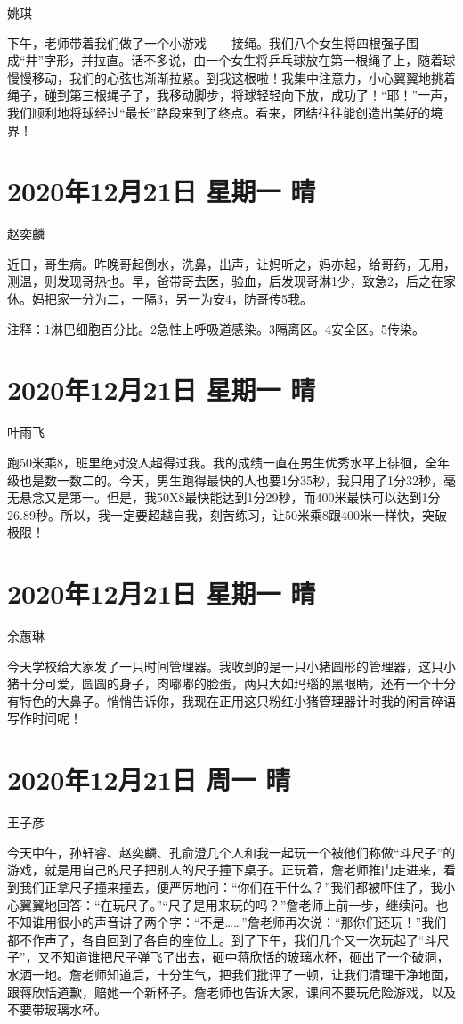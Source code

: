 姚琪

下午，老师带着我们做了一个小游戏——接绳。我们八个女生将四根强子围成“井”字形，并拉直。话不多说，由一个女生将乒乓球放在第一根绳子上，随着球慢慢移动，我们的心弦也渐渐拉紧。到我这根啦！我集中注意力，小心翼翼地挑着绳子，碰到第三根绳子了，我移动脚步，将球轻轻向下放，成功了！“耶！”一声，我们顺利地将球经过“最长”路段来到了终点。看来，团结往往能创造出美好的境界！

\section{2020年12月21日 星期一 晴}

赵奕麟

近日，哥生病。昨晚哥起倒水，洗鼻，出声，让妈听之，妈亦起，给哥药，无用，测温，则发现哥热也。早，爸带哥去医，验血，后发现哥淋1少，致急2，后之在家休。妈把家一分为二，一隔3，另一为安4，防哥传5我。

注释：1淋巴细胞百分比。2急性上呼吸道感染。3隔离区。4安全区。5传染。

\section{2020年12月21日 星期一 晴}

叶雨飞

跑50米乘8，班里绝对没人超得过我。我的成绩一直在男生优秀水平上徘徊，全年级也是数一数二的。今天，男生跑得最快的人也要1分35秒，我只用了1分32秒，毫无悬念又是第一。但是，我50X8最快能达到1分29秒，而400米最快可以达到1分26.89秒。所以，我一定要超越自我，刻苦练习，让50米乘8跟400米一样快，突破极限！

\section{2020年12月21日 星期一 晴}

余蕙琳

今天学校给大家发了一只时间管理器。我收到的是一只小猪圆形的管理器，这只小猪十分可爱，圆圆的身子，肉嘟嘟的脸蛋，两只大如玛瑙的黑眼睛，还有一个十分有特色的大鼻子。悄悄告诉你，我现在正用这只粉红小猪管理器计时我的闲言碎语写作时间呢！

\section{2020年12月21日 周一 晴}

王子彦

今天中午，孙轩睿、赵奕麟、孔俞澄几个人和我一起玩一个被他们称做“斗尺子”的游戏，就是用自己的尺子把别人的尺子撞下桌子。正玩着，詹老师推门走进来，看到我们正拿尺子撞来撞去，便严厉地问：“你们在干什么？”我们都被吓住了，我小心翼翼地回答：“在玩尺子。”“尺子是用来玩的吗？”詹老师上前一步，继续问。也不知谁用很小的声音讲了两个字：“不是……”詹老师再次说：“那你们还玩！”我们都不作声了，各自回到了各自的座位上。到了下午，我们几个又一次玩起了“斗尺子”，又不知道谁把尺子弹飞了出去，砸中蒋欣恬的玻璃水杯，砸出了一个破洞，水洒一地。詹老师知道后，十分生气，把我们批评了一顿，让我们清理干净地面，跟蒋欣恬道歉，赔她一个新杯子。詹老师也告诉大家，课间不要玩危险游戏，以及不要带玻璃水杯。

